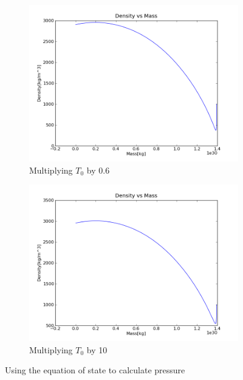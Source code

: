 \documentclass[a4paper,12pt]{article}
\begin{document}
\begin{figure}[H]
    \centering
    \begin{subfigure}{0.49\textwidth}
      \includegraphics[width=\textwidth]{Calculate_pressure/Density_for_rho_p_t_others_constant_Ttimes0_6}
      \caption{Multiplying $T_0$ by 0.6}
      \label{fig:density_pressure_Ttimes0_6}
    \end{subfigure}
    \begin{subfigure}{0.49\textwidth}
      \includegraphics[width=\textwidth]{Calculate_pressure/Density_for_rho_p_t_others_constant_Ttimes10}
      \caption{Multiplying $T_0$ by 10}
      \label{fig:density_pressure_Ttimes10}
    \end{subfigure}
    \caption{Using the equation of state to calculate pressure}
\end{figure}
\end{document}
